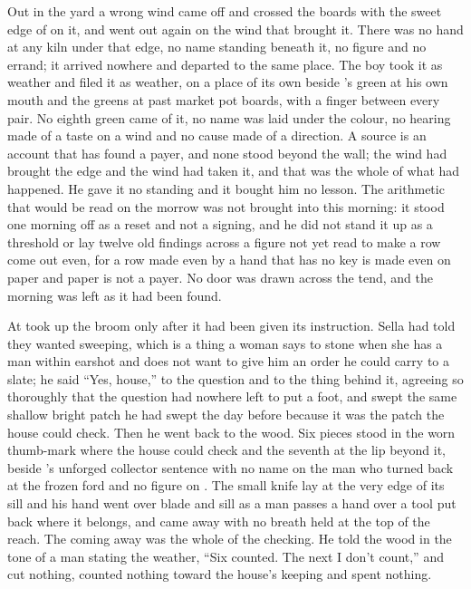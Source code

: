 Out in the yard a wrong wind came off  and crossed the boards with the sweet edge of  on it, and went out again on the wind that brought it. There was no hand at any kiln under that edge, no name standing beneath it, no figure and no errand; it arrived nowhere and departed to the same place. The boy took it as weather and filed it as weather, on a place of its own beside 's green at his own mouth and the greens at past market pot boards, with a finger between every pair. No eighth green came of it, no name was laid under the colour, no hearing made of a taste on a wind and no cause made of a direction. A source is an account that has found a payer, and none stood beyond the wall; the wind had brought the edge and the wind had taken it, and that was the whole of what had happened. He gave it no standing and it bought him no lesson. The arithmetic that would be read on the morrow was not brought into this morning: it stood one morning off as a reset and not a signing, and he did not stand it up as a threshold or lay twelve old findings across a figure not yet read to make a row come out even, for a row made even by a hand that has no key is made even on paper and paper is not a payer. No door was drawn across the tend, and the morning was left as it had been found.

At   took up the broom only after it had been given its instruction. Sella had told  they wanted sweeping, which is a thing a woman says to stone when she has a man within earshot and does not want to give him an order he could carry to a slate; he said “Yes, house,” to the question and to the thing behind it, agreeing so thoroughly that the question had nowhere left to put a foot, and swept the same shallow bright patch he had swept the day before because it was the patch the house could check. Then he went back to the wood. Six pieces stood in the worn thumb-mark where the house could check and the seventh at the lip beyond it, beside 's unforged collector sentence with no name on the man who turned back at the frozen ford and no figure on . The small knife lay at the very edge of its sill and his hand went over blade and sill as a man passes a hand over a tool put back where it belongs, and came away with no breath held at the top of the reach. The coming away was the whole of the checking. He told the wood in the tone of a man stating the weather, “Six counted. The next I don't count,” and cut nothing, counted nothing toward the house's keeping and spent nothing.

